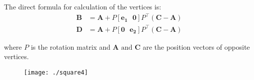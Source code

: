 \documentclass[12pt]{article}
\let\vec\mathbf
\begin{document}
The direct formula for calculation of the vertices is:
\begin{align*}
\vec{B} &= \vec{A} + P[\vec{e_{1}}\text{ }\vec{0}]P^\top(\vec{C}-\vec{A})\\
\vec{D} &= \vec{A} + P[\vec{0} \text{ }\vec{e_{2}}]P^\top(\vec{C}-\vec{A})
\end{align*}

where $P$ is the rotation matrix and $\vec{A} \text{ and } \vec{C}$ are the position vectors of opposite vertices.

\begin{figure}[!h]
	\begin{center} 
	    \texttt{[image: ./square4]}
	\end{center}
\caption{}
\label{fig:Fig5}
\end{figure}
\end{document}
